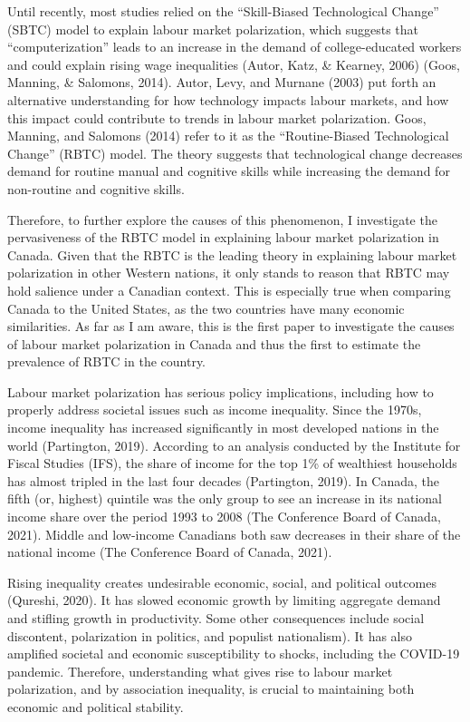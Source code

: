 \documentclass[undefended]{bumrp}
\begin{document}
Until recently, most studies relied on the “Skill-Biased Technological Change” (SBTC) model to explain labour market polarization, which suggests that “computerization” leads to an increase in the demand of college-educated workers and could explain rising wage inequalities (Autor, Katz, \& Kearney, 2006) (Goos, Manning, \& Salomons, 2014). Autor,  Levy,  and Murnane (2003) put forth an alternative understanding for how technology impacts labour markets, and how this impact could contribute to trends in labour market polarization. Goos, Manning, and Salomons (2014) refer to it as the “Routine-Biased Technological Change” (RBTC) model. The theory suggests that technological change decreases demand for routine manual and cognitive skills while increasing the demand for non-routine and cognitive skills.

Therefore, to further explore the causes of this phenomenon, I investigate the pervasiveness of the RBTC model in explaining labour market polarization in Canada. Given that the RBTC is the leading theory in explaining labour market polarization in other Western nations, it only stands to reason that RBTC may hold salience under a Canadian context. This is especially true when comparing Canada to the United States, as the two countries have many economic similarities. As far as I am aware, this is the first paper to investigate the causes of labour market polarization in Canada and thus the first to estimate the prevalence of RBTC in the country.

Labour market polarization has serious policy implications, including how to properly address societal issues such as income inequality. Since the 1970s, income inequality has increased significantly in most developed nations in the world (Partington, 2019). According to an analysis conducted by the Institute for Fiscal Studies (IFS), the share of income for the top 1\% of wealthiest households has almost tripled in the last four decades (Partington, 2019). In Canada, the fifth (or, highest) quintile was the only group to see an increase in its national income share over the period 1993 to 2008 (The Conference Board of Canada, 2021). Middle and low-income Canadians both saw decreases in their share of the national income (The Conference Board of Canada, 2021).

Rising inequality creates undesirable economic, social, and political outcomes (Qureshi, 2020). It has slowed economic growth by limiting aggregate demand and stifling growth in productivity. Some other consequences include social discontent, polarization in politics, and populist nationalism). It has also amplified societal and economic susceptibility to shocks, including the COVID-19 pandemic. Therefore, understanding what gives rise to labour market polarization, and by association inequality, is crucial to maintaining both economic and political stability. 
\end{document}
